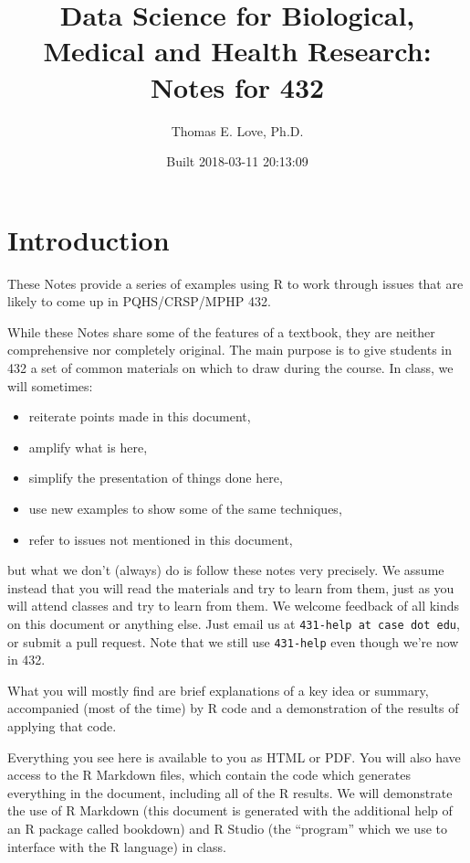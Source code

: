 \documentclass[]{book}
\title{Data Science for Biological, Medical and Health Research: Notes for 432}
\author{Thomas E. Love, Ph.D.}
\date{Built 2018-03-11 20:13:09}
\providecommand{\tightlist}{%
  \setlength{\itemsep}{0pt}\setlength{\parskip}{0pt}}
\theoremstyle{definition}
\theoremstyle{definition}
\theoremstyle{definition}
\theoremstyle{remark}
\begin{document}
\maketitle

{
\setcounter{tocdepth}{1}
\tableofcontents
}
\chapter*{Introduction}\label{introduction}

These Notes provide a series of examples using R to work through issues
that are likely to come up in PQHS/CRSP/MPHP 432.

While these Notes share some of the features of a textbook, they are
neither comprehensive nor completely original. The main purpose is to
give students in 432 a set of common materials on which to draw during
the course. In class, we will sometimes:

\begin{itemize}
\tightlist
\item
  reiterate points made in this document,
\item
  amplify what is here,
\item
  simplify the presentation of things done here,
\item
  use new examples to show some of the same techniques,
\item
  refer to issues not mentioned in this document,
\end{itemize}

but what we don't (always) do is follow these notes very precisely. We
assume instead that you will read the materials and try to learn from
them, just as you will attend classes and try to learn from them. We
welcome feedback of all kinds on this document or anything else. Just
email us at \texttt{431-help\ at\ case\ dot\ edu}, or submit a pull
request. Note that we still use \texttt{431-help} even though we're now
in 432.

What you will mostly find are brief explanations of a key idea or
summary, accompanied (most of the time) by R code and a demonstration of
the results of applying that code.

Everything you see here is available to you as HTML or PDF. You will
also have access to the R Markdown files, which contain the code which
generates everything in the document, including all of the R results. We
will demonstrate the use of R Markdown (this document is generated with
the additional help of an R package called bookdown) and R Studio (the
``program'' which we use to interface with the R language) in class.
\end{document}
